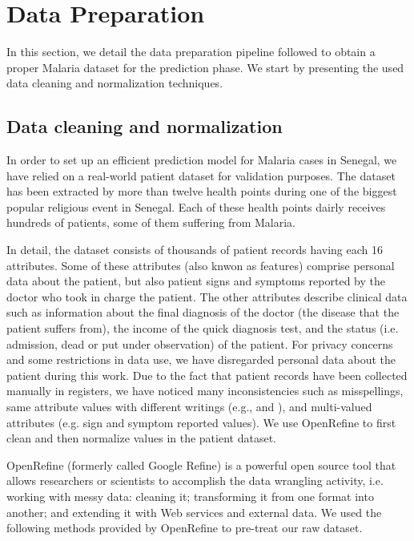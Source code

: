 \section{Data Preparation}\label{data_prep}
In this section, we detail the data preparation pipeline followed to obtain a proper Malaria dataset for the prediction phase.
We start by presenting the used data cleaning and normalization techniques.


\subsection{Data cleaning and normalization}
In order to set up an efficient prediction model for Malaria cases in Senegal, we have relied on a real-world patient dataset
for validation purposes. The dataset has been extracted by more than twelve health points during one of the biggest 
popular religious event in Senegal. Each of these health points dairly receives hundreds of patients, some of them 
suffering from Malaria. 

In detail, the dataset consists of thousands of patient records having each 16 attributes. Some of these
attributes (also knwon as features) comprise personal data about the patient, but also patient signs and symptoms
reported by the doctor who took in charge the patient. The other attributes describe clinical data such as information about the final diagnosis
of the doctor (the disease that the patient suffers from), the income of the quick diagnosis test, and the status (i.e. admission, 
dead or put under observation) of the patient. For privacy concerns and some restrictions in data use, we have disregarded personal data about
the patient during this work. Due to the fact that patient records have been collected manually in registers, we have noticed many inconsistencies 
such as misspellings, same attribute values with different writings (e.g.,  and ),
 and multi-valued attributes (e.g. sign and symptom reported values). We use OpenRefine \cite{Ku16,openRefine} to first clean and then normalize values in the patient dataset.

OpenRefine (formerly called Google Refine) is a powerful open source tool that allows researchers or scientists to accomplish the data wrangling activity, i.e. 
working with messy data: cleaning it; transforming it from one format into another; and extending it with Web services and external data.    
We used the following methods provided by OpenRefine to pre-treat our raw dataset.


